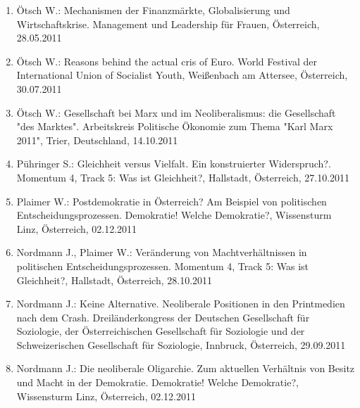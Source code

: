 \begin{enumerate}
	\item Ötsch W.: Mechanismen der Finanzmärkte, Globalisierung und Wirtschaftskrise. Management und Leadership für Frauen, Österreich, 28.05.2011
	\item Ötsch W.: Reasons behind the actual cris of Euro. World Festival der International Union of Socialist Youth, Weißenbach am Attersee, Österreich, 30.07.2011
	\item Ötsch W.: Gesellschaft bei Marx und im Neoliberalismus: die Gesellschaft "des Marktes". Arbeitskreis Politische Ökonomie zum Thema "Karl Marx 2011", Trier, Deutschland, 14.10.2011
	\item Pühringer S.: Gleichheit versus Vielfalt. Ein konstruierter Widerspruch?. Momentum 4, Track 5: Was ist Gleichheit?, Hallstadt, Österreich, 27.10.2011
	\item Plaimer W.: Postdemokratie in Österreich? Am Beispiel von politischen Entscheidungsprozessen. Demokratie! Welche Demokratie?, Wissensturm Linz, Österreich, 02.12.2011
	\item Nordmann J., Plaimer W.: Veränderung von Machtverhältnissen in politischen Entscheidungsprozessen. Momentum 4, Track 5: Was ist Gleichheit?, Hallstadt, Österreich, 28.10.2011
	\item Nordmann J.: Keine Alternative. Neoliberale Positionen in den Printmedien nach dem Crash. Dreiländerkongress der Deutschen Gesellschaft für Soziologie, der Österreichischen Gesellschaft für Soziologie und der Schweizerischen Gesellschaft für Soziologie, Innbruck, Österreich, 29.09.2011
	\item Nordmann J.: Die neoliberale Oligarchie. Zum aktuellen Verhältnis von Besitz und Macht in der Demokratie. Demokratie! Welche Demokratie?, Wissensturm Linz, Österreich, 02.12.2011
\end{enumerate}

